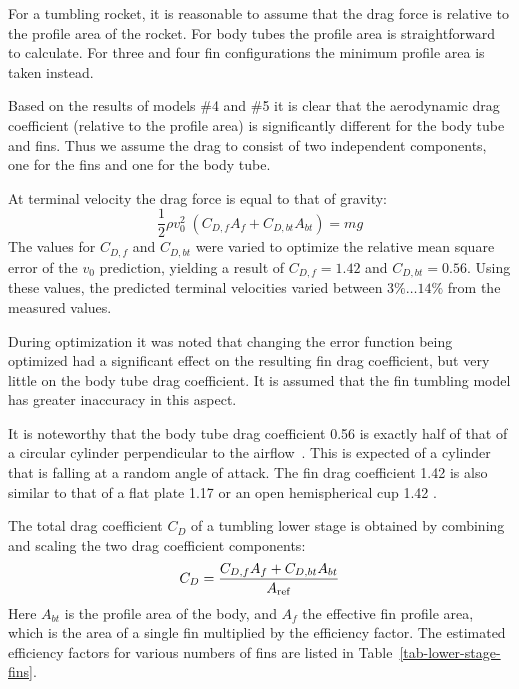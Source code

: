 For a tumbling rocket, it is reasonable to assume that the drag force
is relative to the profile area of the rocket.  For body tubes the
profile area is straightforward to calculate.  For three and four fin
configurations the minimum profile area is taken instead.

Based on the results of models \#4 and \#5 it is clear that the
aerodynamic drag coefficient (relative to the profile area) is
significantly different for the body tube and fins.  Thus we assume
the drag to consist of two independent components, one for the fins
and one for the body tube.

At terminal velocity the drag force is equal to that of gravity:
%
\begin{equation}
\frac{1}{2}\rho v_0^2\; (C_{D,f}A_f  + C_{D,bt}A_{bt}) = mg
\end{equation}
%
The values for $C_{D,f}$ and $C_{D,bt}$ were varied to optimize the
relative mean square error of the $v_0$ prediction, yielding a result
of $C_{D,f} = 1.42$ and $C_{D,bt} = 0.56$.  Using these values, the
predicted terminal velocities varied between $3\%\ldots14\%$ from the
measured values.

During optimization it was noted that changing the error function
being optimized had a significant effect on the resulting fin drag
coefficient, but very little on the body tube drag coefficient.  It is
assumed that the fin tumbling model has greater inaccuracy in this
aspect.

It is noteworthy that the body tube drag coefficient 0.56 is exactly
half of that of a circular cylinder perpendicular to the
airflow~\cite[p.~3-11]{hoerner}. This is expected of a cylinder that
is falling at a random angle of attack.  The fin drag coefficient 1.42
is also similar to that of a flat plate 1.17 or an open hemispherical
cup 1.42 \cite[p.~3-17]{hoerner}.

The total drag coefficient $C_D$ of a tumbling lower stage is obtained
by combining and scaling the two drag coefficient components:
%
\begin{equation}
C_D = \frac{C_{D,f}A_f  + C_{D,bt}A_{bt}}{A_{\rm ref}}
\end{equation}
%
Here $A_{bt}$ is the profile area of the body, and $A_f$ the effective
fin profile area, which is the area of a single fin multiplied by the
efficiency factor.  The estimated efficiency factors for various
numbers of fins are listed in Table~\ref{tab-lower-stage-fins}.

